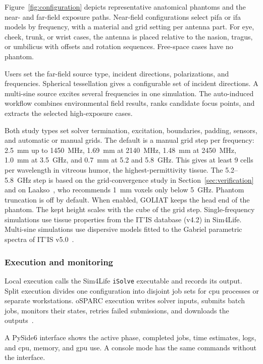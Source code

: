 \documentclass[final,5p,times,twocolumn]{elsarticle}
\begin{document}
Figure~\ref{fig:configuration} depicts representative anatomical phantoms and the near- and far-field exposure paths. Near-field configurations select \gls{pifa} or \gls{ifa} models by frequency, with a material and grid setting per antenna part. For eye, cheek, trunk, or wrist cases, the antenna is placed relative to the nasion, tragus, or umbilicus with offsets and rotation sequences. Free-space cases have no phantom.

Users set the far-field source type, incident directions, polarizations, and frequencies. Spherical tessellation gives a configurable set of incident directions. A multi-sine source excites several frequencies in one simulation. The auto-induced workflow combines environmental field results, ranks candidate focus points, and extracts the selected high-exposure cases.

Both study types set solver termination, excitation, boundaries, padding, sensors, and automatic or manual grids. The default is a manual grid step per frequency: 2.5~mm up to 1450~MHz, 1.69~mm at 2140~MHz, 1.48~mm at 2450~MHz, 1.0~mm at 3.5~GHz, and 0.7~mm at 5.2 and 5.8~GHz. This gives at least 9 cells per wavelength in vitreous humor, the highest-permittivity tissue. The 5.2--5.8~GHz step is based on the grid-convergence study in Section~\ref{sec:verification} and on Laakso~\cite{Laakso2009}, who recommends 1~mm voxels only below 5~GHz. Phantom truncation is off by default. When enabled, GOLIAT keeps the head end of the phantom. The kept height scales with the cube of the grid step. Single-frequency simulations use tissue properties from the IT'IS database (v4.2) in Sim4Life. Multi-sine simulations use dispersive models fitted to the Gabriel parametric spectra of IT'IS v5.0~\cite{Gabriel1996,ITIS2024}.

\subsubsection{Execution and monitoring}

Local execution calls the Sim4Life \texttt{iSolve} executable and records its output. Split execution divides one configuration into disjoint job sets for \gls{cpu} processes or separate workstations. oSPARC execution writes solver inputs, submits batch jobs, monitors their states, retries failed submissions, and downloads the outputs~\cite{oSPARC}.

A PySide6 interface shows the active phase, completed jobs, time estimates, logs, and \gls{cpu}, memory, and \gls{gpu} use. A console mode has the same commands without the interface.
\end{document}
